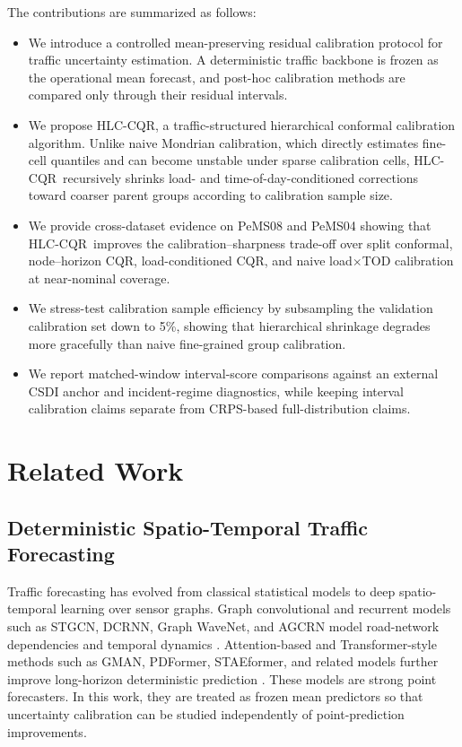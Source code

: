 \documentclass[letterpaper,journal]{IEEEtran}
\newcommand{\hlc}{HLC-CQR}
\begin{document}
The contributions are summarized as follows:
\begin{itemize}
    \item We introduce a controlled mean-preserving residual calibration protocol for traffic uncertainty estimation. A deterministic traffic backbone is frozen as the operational mean forecast, and post-hoc calibration methods are compared only through their residual intervals.
    \item We propose \hlc, a traffic-structured hierarchical conformal calibration algorithm. Unlike naive Mondrian calibration, which directly estimates fine-cell quantiles and can become unstable under sparse calibration cells, \hlc\ recursively shrinks load- and time-of-day-conditioned corrections toward coarser parent groups according to calibration sample size.
    \item We provide cross-dataset evidence on PeMS08 and PeMS04 showing that \hlc\ improves the calibration--sharpness trade-off over split conformal, node--horizon CQR, load-conditioned CQR, and naive load$\times$TOD calibration at near-nominal coverage.
    \item We stress-test calibration sample efficiency by subsampling the validation calibration set down to 5\%, showing that hierarchical shrinkage degrades more gracefully than naive fine-grained group calibration.
    \item We report matched-window interval-score comparisons against an external CSDI anchor and incident-regime diagnostics, while keeping interval calibration claims separate from CRPS-based full-distribution claims.
\end{itemize}

\section{Related Work}

\subsection{Deterministic Spatio-Temporal Traffic Forecasting}
Traffic forecasting has evolved from classical statistical models to deep spatio-temporal learning over sensor graphs. Graph convolutional and recurrent models such as STGCN, DCRNN, Graph WaveNet, and AGCRN model road-network dependencies and temporal dynamics \cite{yu2018stgcn,li2018dcrnn,wu2019graphwavenet,bai2020agcrn}. Attention-based and Transformer-style methods such as GMAN, PDFormer, STAEformer, and related models further improve long-horizon deterministic prediction \cite{zheng2020gman,jiang2023pdformer,liu2023staeformer}. These models are strong point forecasters. In this work, they are treated as frozen mean predictors so that uncertainty calibration can be studied independently of point-prediction improvements.
\end{document}
